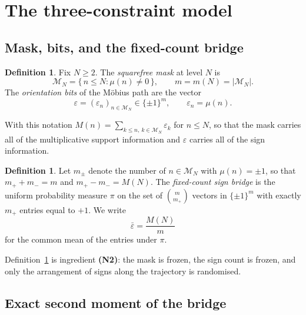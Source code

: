 \documentclass[11pt]{amsart}
\numberwithin{equation}{section}
\theoremstyle{plain}
\theoremstyle{definition}
\newtheorem{definition}[theorem]{Definition}
\theoremstyle{remark}
\begin{document}
\section{The three-constraint model}
\label{sec:three_conditionings}

\subsection{Mask, bits, and the fixed-count bridge}
\label{subsec:mask_and_bits}

\begin{definition}
\label{def:mask}
Fix $N \ge 2$. The \emph{squarefree mask} at level $N$ is
\begin{equation}
\mathcal{M}_N = \{\, n \le N : \mu(n) \neq 0 \,\},
\qquad
m = m(N) = |\mathcal{M}_N| .
\label{eq:mask_definition}
\end{equation}
The \emph{orientation bits} of the M\"obius path are the vector
\begin{equation}
\varepsilon = (\varepsilon_n)_{n \in \mathcal{M}_N} \in \{\pm 1\}^{m},
\qquad
\varepsilon_n = \mu(n).
\label{eq:orientation_bits}
\end{equation}
\end{definition}

With this notation $M(n) = \sum_{k \le n,\ k \in \mathcal{M}_N}
\varepsilon_k$ for $n \le N$, so that the mask carries all of the
multiplicative support information and $\varepsilon$ carries all of the
sign information.

\begin{definition}
\label{def:fixed_count_bridge}
Let $m_{\pm}$ denote the number of $n \in \mathcal{M}_N$ with
$\mu(n) = \pm 1$, so that $m_+ + m_- = m$ and $m_+ - m_- = M(N)$. The
\emph{fixed-count sign bridge} is the uniform probability measure
$\pi$ on the set of $\binom{m}{m_+}$ vectors in $\{\pm 1\}^m$ with
exactly $m_+$ entries equal to $+1$. We write
\begin{equation}
\bar{\varepsilon} = \frac{M(N)}{m}
\label{eq:mean_bit}
\end{equation}
for the common mean of the entries under $\pi$.
\end{definition}

Definition~\ref{def:fixed_count_bridge} is ingredient \textbf{(N2)}:
the mask is frozen, the sign count is frozen, and only the arrangement
of signs along the trajectory is randomised.

\subsection{Exact second moment of the bridge}
\label{subsec:bridge_second_moment}
\end{document}
